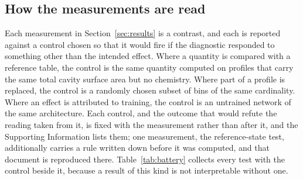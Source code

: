 \subsection{How the measurements are read}

Each measurement in Section~\ref{sec:results} is a contrast, and each is reported against a
control chosen so that it would fire if the diagnostic responded to something other than the
intended effect. Where a quantity is compared with a reference table, the control is the same
quantity computed on profiles that carry the same total cavity surface area but no chemistry.
Where part of a profile is replaced, the control is a randomly chosen subset of bins of the same
cardinality. Where an effect is attributed to training, the control is an untrained network of the
same architecture. Each control, and the outcome that would refute the reading taken from it, is
fixed with the measurement rather than after it, and the Supporting Information lists them; one
measurement, the reference-state test, additionally carries a rule written down before it was
computed, and that document is reproduced there. Table~\ref{tab:battery} collects every test with
the control beside it, because a result of this kind is not interpretable without one.
